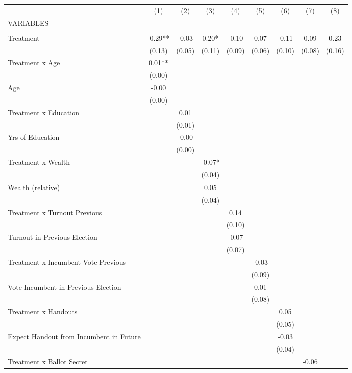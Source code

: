 \begin{tabular}{lcccccccc} \hline
 & (1) & (2) & (3) & (4) & (5) & (6) & (7) & (8) \\
VARIABLES &  &  &  &  &  &  &  &  \\ \hline
 &  &  &  &  &  &  &  &  \\
Treatment & -0.29** & -0.03 & 0.20* & -0.10 & 0.07 & -0.11 & 0.09 & 0.23 \\
 & (0.13) & (0.05) & (0.11) & (0.09) & (0.06) & (0.10) & (0.08) & (0.16) \\
Treatment x Age & 0.01** &  &  &  &  &  &  &  \\
 & (0.00) &  &  &  &  &  &  &  \\
Age & -0.00 &  &  &  &  &  &  &  \\
 & (0.00) &  &  &  &  &  &  &  \\
Treatment x Education &  & 0.01 &  &  &  &  &  &  \\
 &  & (0.01) &  &  &  &  &  &  \\
Yrs of Education &  & -0.00 &  &  &  &  &  &  \\
 &  & (0.00) &  &  &  &  &  &  \\
Treatment x Wealth &  &  & -0.07* &  &  &  &  &  \\
 &  &  & (0.04) &  &  &  &  &  \\
Wealth (relative) &  &  & 0.05 &  &  &  &  &  \\
 &  &  & (0.04) &  &  &  &  &  \\
Treatment x Turnout Previous &  &  &  & 0.14 &  &  &  &  \\
 &  &  &  & (0.10) &  &  &  &  \\
Turnout in Previous Election &  &  &  & -0.07 &  &  &  &  \\
 &  &  &  & (0.07) &  &  &  &  \\
Treatment x Incumbent Vote Previous &  &  &  &  & -0.03 &  &  &  \\
 &  &  &  &  & (0.09) &  &  &  \\
Vote Incumbent in Previous Election &  &  &  &  & 0.01 &  &  &  \\
 &  &  &  &  & (0.08) &  &  &  \\
Treatment x Handouts &  &  &  &  &  & 0.05 &  &  \\
 &  &  &  &  &  & (0.05) &  &  \\
Expect Handout from Incumbent in Future &  &  &  &  &  & -0.03 &  &  \\
 &  &  &  &  &  & (0.04) &  &  \\
Treatment x Ballot Secret &  &  &  &  &  &  & -0.06 &  \\

\end{tabular}
